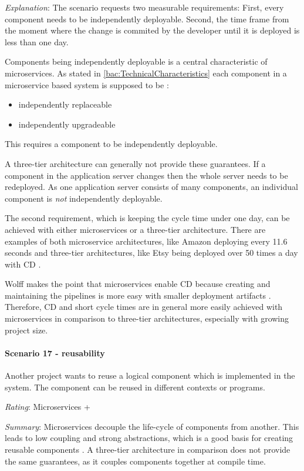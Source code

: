 \textit{Explanation}:
The scenario requests two measurable requirements:
First, every component needs to be independently deployable.
Second, the time frame from the moment where the change is commited by the developer until it is deployed is less than one day.

Components being independently deployable is a central characteristic of microservices.
As stated in \ref{bac:TechnicalCharacteristics} each component in a microservice based system is supposed to be \cite{FowlerComponentization2014}:
\begin{itemize}
\item independently replaceable
\item independently upgradeable
\end{itemize}
This requires a component to be independently deployable.

A three-tier architecture can generally not provide these guarantees. 
If a component in the application server changes then the whole server needs to be redeployed.
As one application server consists of many components, an individual component is \textit{not} independently deployable.

The second requirement, which is keeping the cycle time under one day, can be achieved with either microservices or a three-tier architecture.
There are examples of both microservice architectures, like Amazon deploying every 11.6 seconds and three-tier architectures, like Etsy being deployed over 50 times a day with \ac{CD}  \cite{Jenkins2011} \cite{Etsy2014}.

Wolff makes the point that microservices enable \ac{CD} because creating and maintaining the pipelines is more easy with smaller deployment artifacts \citep[p. 5]{Wolff2016}.
Therefore, \ac{CD} and short cycle times are in general more easily achieved with microservices in comparison to three-tier architectures, especially with growing project size.

\paragraph{Scenario 17 - reusability}
Another project wants to reuse a logical component which is implemented in the system. The component can be reused in different contexts or programs.
\label{quaMicro:s17}

\textit{Rating}: Microservices +

\textit{Summary}: 
Microservices decouple the life-cycle of components from another.
This leads to low coupling and strong abstractions, which is a good basis for creating reusable components \cite[p. 466]{Sommerville2015}.
A three-tier architecture in comparison does not provide the same guarantees, as it couples components together at compile time.

